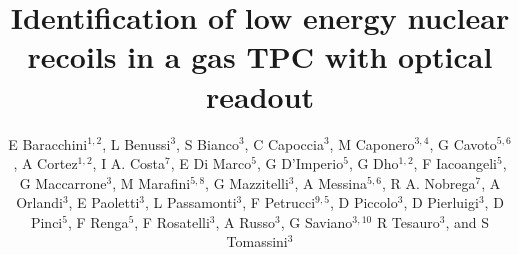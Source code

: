 \documentclass[12pt]{iopart}
\begin{document}
\title[]{Identification of low energy nuclear recoils in a gas TPC with optical readout}

\newcommand {\ie}{\mbox{i.e.}\xspace}     %
\newcommand {\eg}{\mbox{e.g.}\xspace}     %

\newcommand{\fe}{\ensuremath{^{55}\textrm{Fe}}\xspace}
\newcommand{\abs}[1]{\ensuremath{\vert #1 \vert}}
\newcommand{\ambe}{\ensuremath{\textrm{Am} \textrm{Be}}\xspace}
\newcommand{\isclu}{\ensuremath{I_{SC}}\xspace}
\newcommand{\tsigmag}{\ensuremath{\sigma^T_{Gauss}}\xspace}
\newcommand{\dedl}{\ensuremath{\frac{dE}{dl_p}}\xspace}

\newcommand{\lemon}{{\textsc{Lemon}}\xspace}
\newcommand{\cygno}{{\textsc{Cygno}}\xspace}
\newcommand{\idbscan}{{\textsc{Idbscan}}\xspace}
\newcommand{\dbscan}{{\textsc{dbscan}}\xspace}
\newcommand{\gac}{{\textsc{Gac}}\xspace}
\newcommand{\nnc}{{\textsc{Nnc}}\xspace}
\newcommand{\GEANTfour} {{\textsc{Geant4}}\xspace}
\newcommand{\SRIM} {{\textsc{Srim}}\xspace}
\newcommand{\garfield} {{\textsc{Garfield}}\xspace}
\newcommand{\PYTHONthree} {{\textsc{Python3}}\xspace}
\newcommand{\ROOT} {{\textsc{Root}}\xspace}

\newcommand{\unit}[1]{\ensuremath{\textrm{\,#1}}\xspace}
\newcommand{\keV}{\ensuremath{\,\textrm{ke\hspace{-.08em}V}}\xspace}
\newcommand{\MeV}{\ensuremath{\,\textrm{Me\hspace{-.08em}V}}\xspace}




\author{E Baracchini$^{1,2}$,
L Benussi$^{3}$,
S Bianco$^{3}$,
C Capoccia$^{3}$, 
M Caponero$^{3,4}$,
G Cavoto$^{5,6}$,
A Cortez$^{1,2}$,
I A. Costa$^{7}$,
E Di Marco$^{5}$,
G D'Imperio$^{5}$,
G Dho$^{1,2}$,
F Iacoangeli$^{5}$,
G Maccarrone$^{3}$,
M Marafini$^{5,8}$,
G Mazzitelli$^{3}$,
A Messina$^{5,6}$,
R A. Nobrega$^{7}$,
A Orlandi$^{3}$,
E Paoletti$^{3}$,
L Passamonti$^{3}$,
F Petrucci$^{9,5}$,
D Piccolo$^{3}$,
D Pierluigi$^{3}$,
D Pinci$^{5}$,
F Renga$^{5}$,
F Rosatelli$^{3}$,
A Russo$^{3}$,
G Saviano$^{3,10}$
R Tesauro$^{3}$,
and S Tomassini$^{3}$}

\address{$^1$Gran~Sasso~Science~Institute, L'Aquila, Italy}
\address{$^2$INFN, Laboratori Nazionali del Gran Sasso, Assergi, Italy}
\address{$^3$INFN, Laboratori Nazionali di Frascati, Frascati, Italy}
\address{$^4$ENEA Centro Ricerche Frascati, Frascati, Italy}
\address{$^5$INFN, Sezione di Roma, Roma, Italy}
\address{$^6$Dipartimento di Fisica, Sapienza Universit\`a di Roma, Roma, Italy}
\address{$^7$Universidade Federal de Juiz de Fora, Juiz de Fora, Brasil}
\address{$^8$Museo Storico della Fisica e Centro Studi e Ricerche ``Enrico Fermi'', Roma, Italy}
\address{$^9$Dipartimento di Matematica e Fisica, Universit\`a Roma TRE, Roma, Italy}
\address{$^{10}$Dipartimento di Ingegneria Chimica, Materiali e Ambiente, Sapienza Universit\`a di Roma, Roma, Italy}
\end{document}
